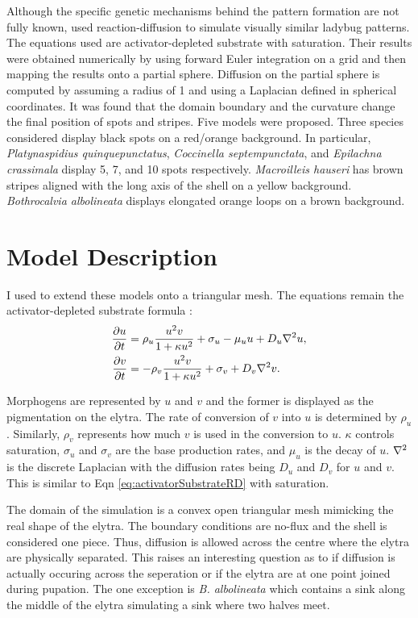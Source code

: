 Although the specific genetic mechanisms behind the pattern formation are not fully known, \citet{Liaw2001} used reaction-diffusion to simulate visually similar ladybug patterns. The equations used are activator-depleted substrate with saturation. Their results were obtained numerically by using forward Euler integration on a grid and then mapping the results onto a partial sphere. Diffusion on the partial sphere is computed by assuming a radius of 1 and using a Laplacian defined in spherical coordinates. It was found that the domain boundary and the curvature change the final position of spots and stripes. Five models were proposed. Three species considered display black spots on a red/orange background. In particular, \textit{Platynaspidius quinquepunctatus}, \textit{Coccinella septempunctata}, and \textit{Epilachna crassimala} display 5, 7, and 10 spots respectively. \textit{Macroilleis hauseri} has brown stripes aligned with the long axis of the shell on a yellow background. \textit{Bothrocalvia albolineata} displays elongated orange loops on a brown background.

\section{Model Description} 
I used \ProgramName{} to extend these models onto a triangular mesh. The equations remain the activator-depleted substrate formula \citep{Meinhardt1982}:
\begin{equation}
	\begin{aligned} \label{eq:ladybugRD}
   \frac{\partial u}{\partial t} &= \rho_u \frac{u^2v}{1+\kappa u^2} + \sigma_u - \mu_u u + D_u \nabla^2 u, \\
   \frac{\partial v}{\partial t} &= -\rho_v \frac{u^2v}{1+\kappa u^2} + \sigma_v + D_v \nabla^2 v.
	\end{aligned}
\end{equation}

Morphogens are represented by $u$ and $v$ and the former is displayed as the pigmentation on the elytra. The rate of conversion of $v$ into $u$ is determined by $\rho_u$. Similarly, $\rho_v$ represents how much $v$ is used in the conversion to $u$. $\kappa$ controls saturation, $\sigma_u$ and $\sigma_v$ are the base production rates, and $\mu_u$ is the decay of $u$. $\nabla^2$ is the discrete Laplacian with the diffusion rates being $D_u$ and $D_v$ for $u$ and $v$. This is similar to Eqn \ref{eq:activatorSubstrateRD} with saturation.

The domain of the simulation is a convex open triangular mesh mimicking the real shape of the elytra. The boundary conditions are no-flux and the shell is considered one piece. Thus, diffusion is allowed across the centre where the elytra are physically separated. This raises an interesting question as to if diffusion is actually occuring across the seperation or if the elytra are at one point joined during pupation. The one exception is \textit{B. albolineata} which contains a sink along the middle of the elytra simulating a sink where two halves meet.

